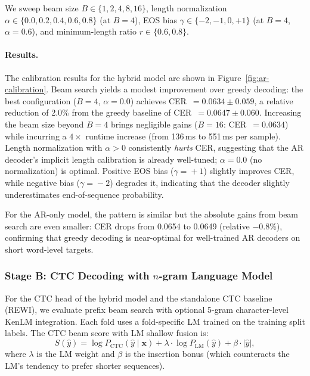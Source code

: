 We sweep beam size $B \in \{1, 2, 4, 8, 16\}$, length normalization $\alpha \in \{0.0, 0.2, 0.4, 0.6, 0.8\}$ (at $B\!=\!4$), EOS bias $\gamma \in \{-2, -1, 0, +1\}$ (at $B\!=\!4$, $\alpha\!=\!0.6$), and minimum-length ratio $r \in \{0.6, 0.8\}$.

\paragraph{Results.}
The calibration results for the hybrid model are shown in Figure~\ref{fig:ar-calibration}.
Beam search yields a modest improvement over greedy decoding: the best configuration ($B\!=\!4$, $\alpha\!=\!0.0$) achieves CER~$=0.0634 \pm 0.059$, a relative reduction of 2.0\% from the greedy baseline of CER~$=0.0647 \pm 0.060$.
Increasing the beam size beyond $B\!=\!4$ brings negligible gains ($B\!=\!16$: CER~$=0.0634$) while incurring a $4\times$ runtime increase (from 136\,ms to 551\,ms per sample).
Length normalization with $\alpha > 0$ consistently \emph{hurts} CER, suggesting that the AR decoder's implicit length calibration is already well-tuned; $\alpha\!=\!0.0$ (no normalization) is optimal.
Positive EOS bias ($\gamma\!=\!+1$) slightly improves CER, while negative bias ($\gamma\!=\!-2$) degrades it, indicating that the decoder slightly underestimates end-of-sequence probability.

For the AR-only model, the pattern is similar but the absolute gains from beam search are even smaller: CER drops from 0.0654 to 0.0649 (relative $-$0.8\%), confirming that greedy decoding is near-optimal for well-trained AR decoders on short word-level targets.


\subsubsection{Stage B: CTC Decoding with $n$-gram Language Model}
\label{sec:decode-stage-b}

For the CTC head of the hybrid model and the standalone CTC baseline (REWI),
we evaluate prefix beam search with optional 5-gram character-level KenLM integration.
Each fold uses a fold-specific LM trained on the training split labels.
The CTC beam score with LM shallow fusion is:
\begin{equation}
    S(\hat{y}) = \log P_\text{CTC}(\hat{y} \mid \mathbf{x}) + \lambda \cdot \log P_\text{LM}(\hat{y}) + \beta \cdot |\hat{y}|,
    \label{eq:ctc-beam-lm}
\end{equation}
where $\lambda$ is the LM weight and $\beta$ is the insertion bonus (which counteracts the LM's tendency to prefer shorter sequences).

